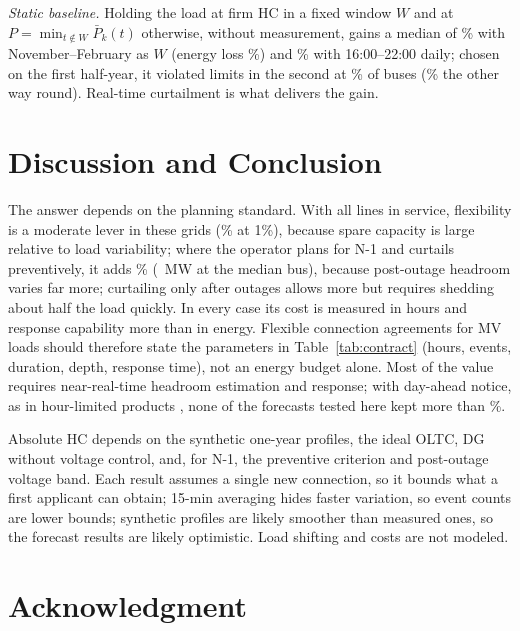 \documentclass[conference,letterpaper]{IEEEtran}
\begin{document}
\emph{Static baseline.} Holding the load at firm HC in a fixed window $W$ and at $P=\min_{t\notin W}\bar P_k(t)$ otherwise, without measurement, gains a median of \todWingain\% with November--February as $W$ (energy loss \todWinen\%) and \todEvegain\% with 16:00--22:00 daily; chosen on the first half-year, it violated limits in the second at \todWinvOT\% of buses (\todWinvTO\% the other way round). Real-time curtailment is what delivers the gain.

\section{Discussion and Conclusion}
The answer depends on the planning standard. With all lines in service, flexibility is a moderate lever in these grids (\poolGcmed\% at 1\%), because spare capacity is large relative to load variability; where the operator plans for N-1 and curtails preventively, it adds \sensNmogO\% (\ctNadd~MW at the median bus), because post-outage headroom varies far more; curtailing only after outages allows more but requires shedding about half the load quickly. In every case its cost is measured in hours and response capability more than in energy. Flexible connection agreements for MV loads should therefore state the parameters in Table~\ref{tab:contract} (hours, events, duration, depth, response time), not an energy budget alone. Most of the value requires near-real-time headroom estimation and response; with day-ahead notice, as in hour-limited products \cite{tennet_tdtr}, none of the forecasts tested here kept more than \fcDaMaxAll\%.

Absolute HC depends on the synthetic one-year profiles, the ideal OLTC, DG without voltage control, and, for N-1, the preventive criterion and post-outage voltage band. Each result assumes a single new connection, so it bounds what a first applicant can obtain; 15-min averaging hides faster variation, so event counts are lower bounds; synthetic profiles are likely smoother than measured ones, so the forecast results are likely optimistic. Load shifting \cite{gu2026hicss} and costs are not modeled.

\section*{Acknowledgment}




\end{document}
